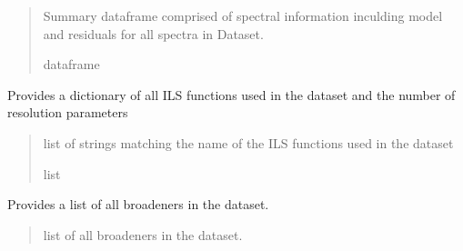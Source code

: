 \documentclass[letterpaper,10pt,english]{sphinxmanual}
\begin{document}
\begin{fulllineitems}
\begin{fulllineitems}
\begin{quote}
\begin{description}
\sphinxAtStartPar
{} \textendash{} Summary dataframe comprised of spectral information inculding model and residuals for all spectra in Dataset.

\sphinxAtStartPar
dataframe

\end{description}\end{quote}

\end{fulllineitems}


\begin{fulllineitems}
\label{\detokenize{MATS:MATS.dataset.Dataset.get_ILS_function_dict}}
\pysigstartsignatures
{}
\pysigstopsignatures
\sphinxAtStartPar
Provides a dictionary of all ILS functions used in the dataset and the number of resolution parameters
\begin{quote}\begin{description}
\sphinxAtStartPar
{} \textendash{} list of strings matching the name of the ILS functions used in the dataset

\sphinxAtStartPar
list

\end{description}\end{quote}

\end{fulllineitems}


\begin{fulllineitems}
\label{\detokenize{MATS:MATS.dataset.Dataset.get_baseline_order}}
\pysigstartsignatures
{}
\pysigstopsignatures
\end{fulllineitems}


\begin{fulllineitems}
\label{\detokenize{MATS:MATS.dataset.Dataset.get_broadener_list}}
\pysigstartsignatures
{}
\pysigstopsignatures
\sphinxAtStartPar
Provides a list of all broadeners in the dataset.
\begin{quote}\begin{description}
\sphinxAtStartPar
{} \textendash{} list of all broadeners in the dataset.


\end{description}
\end{quote}
\end{fulllineitems}
\end{fulllineitems}
\end{document}
